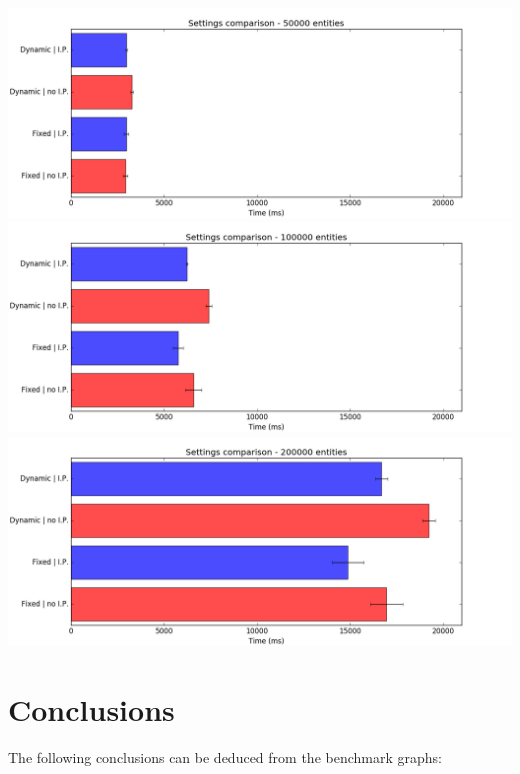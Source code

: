 \documentclass[oneside, 12pt, a4paper, openany]{book}
\begin{document}
\includegraphics{source/figures/bench2/entity_50k.png}
\includegraphics{source/figures/bench2/entity_100k.png}
\includegraphics{source/figures/bench2/entity_200k.png}

\section{Conclusions}\label{conclusions}

The following conclusions can be deduced from the benchmark graphs:
\end{document}
